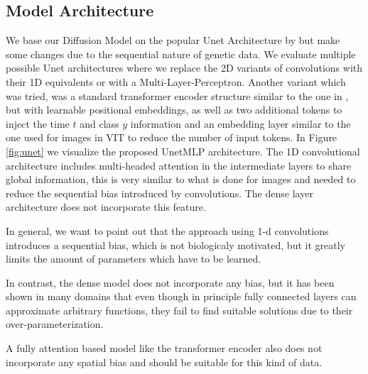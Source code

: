 \subsection{Model Architecture}
We base our Diffusion Model on the popular Unet Architecture by \citet{Unet} but make some changes due to the sequential nature of genetic data.
We evaluate multiple possible Unet architectures where we replace the 2D variants of convolutions with their 1D equivalents or with a Multi-Layer-Perceptron. Another variant which was tried, was a standard transformer encoder structure similar to the one in \cite{bert}, but with learnable positional embeddings, as well as two additional tokens to inject the time $t$ and class $y$ information and an embedding layer similar to the one used for images in VIT\citep{vit} to reduce the number of input tokens. In Figure \ref{fig:unet} we visualize the proposed UnetMLP architecture. The 1D convolutional architecture includes multi-headed attention in the intermediate layers to share global information, this is very similar to what is done for images and needed to reduce the sequential bias introduced by convolutions.
The dense layer architecture does not incorporate this feature.

In general, we want to point out that the approach using 1-d convolutions introduces a sequential bias, which is not biologicaly motivated, but it greatly limits the amount of parameters which have to be learned.

In contrast, the dense model does not incorporate any bias, but it has been shown in many domains that even though in principle fully connected layers can approximate arbitrary functions, they fail to find suitable solutions due to their over-parameterization.

A fully attention based model like the transformer encoder also does not incorporate any spatial bias and should be suitable for this kind of data.







